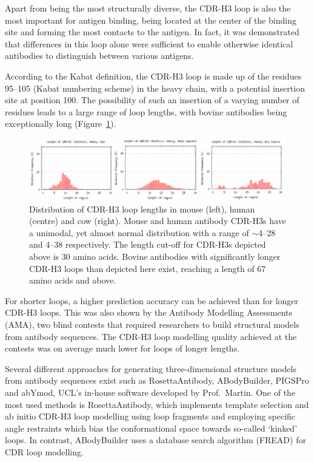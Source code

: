 \documentclass[12pt]{article}
\begin{document}
Apart from being the most structurally diverse, the CDR-H3 loop is
also the most important for antigen binding, being located at the
center of the binding site and forming the most contacts to the
antigen\cite{MacCallum1996}. In fact, it was demonstrated that
differences in this loop alone were sufficient to enable otherwise
identical antibodies to distinguish between various
antigens\cite{Xu2000}.

According to the Kabat definition, the CDR-H3 loop is made up of the
residues 95--105 (Kabat numbering scheme\cite{Kabat1992}) in the heavy
chain, with a potential insertion site at position 100. The
possibility of such an insertion of a varying number of residues leads
to a large range of loop lengths, with bovine antibodies being
exceptionally long (Figure~\ref{fig:loopdist}).

\begin{figure}
  \centering
  \includegraphics[width=\linewidth]{loopdist.eps}
  \caption { Distribution of CDR-H3 loop lengths in mouse (left),
    human (centre) and cow (right). Mouse and human antibody CDR-H3s
    have a unimodal, yet almost normal distribution with a range of
    $\sim$4--28 and 4--38 respectively. The length cut-off for CDR-H3s
    depicted above is 30 amino acids. Bovine antibodies with
    significantly longer CDR-H3 loops than depicted here exist,
    reaching a length of 67 amino acids and
    above\protect\cite{Wong2015}.}  
  \label{fig:loopdist}
\end{figure}

For shorter loops, a higher prediction accuracy can be achieved than
for longer CDR-H3 loops. This was also shown by the Antibody Modelling
Assessments (AMA), two blind contests that required researchers to
build structural models from antibody sequences. The CDR-H3 loop
modelling quality achieved at the contests was on average much lower
for loops of longer lengths\cite{Almagro2011,Almagro2014}.

Several different approaches for generating three-dimensional
structure models from antibody sequences exist such as
RosettaAntibody\cite{Sircar2009,Sivasubramanian2009}, 
ABodyBuilder\cite{Leem2016}, PIGSPro\cite{Lepore2017} and abYmod,
UCL's in-house software developed by Prof.\ Martin. One of the most
used methods is RosettaAntibody, which implements template selection
and ab initio CDR-H3 loop modelling using loop fragments and employing
specific angle restraints which bias the conformational space towards
so-called `kinked' loops\cite{Schoeder2021,Weitzner2017}. In
contrast, ABodyBuilder uses a database search algorithm
(FREAD\cite{Choi2010}) for CDR loop modelling.
\end{document}
